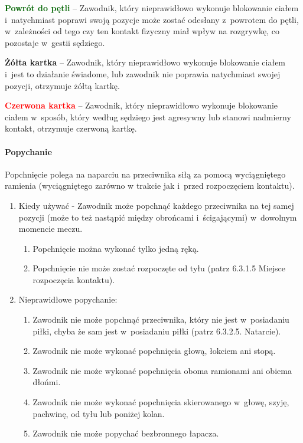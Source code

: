 \documentclass[12pt,a4paper]{article}
\newcommand\redcard[1]{\bgroup\textcolor{red}{\textbf{#1}}}
\newcommand\yellowcard[1]{\bgroup\textcolor{darkyellow}{\textbf{#1}}}
\newcommand\other[1]{\bgroup\textcolor{darkgreen}{\textbf{#1}}}
\begin{document}
\other{Powrót do pętli} -- Zawodnik, który nieprawidłowo wykonuje
blokowanie ciałem i~natychmiast poprawi swoją pozycje może zostać
odesłany z~powrotem do pętli, w~zależności od tego czy ten kontakt
fizyczny miał wpływ na rozgrywkę, co pozostaje w~gestii sędziego.

\yellowcard{Żółta kartka} -- Zawodnik, który nieprawidłowo wykonuje blokowanie
ciałem i~jest to działanie świadome, lub zawodnik nie poprawia
natychmiast swojej pozycji, otrzymuje żółtą kartkę.

\redcard{Czerwona kartka} -- Zawodnik, który nieprawidłowo wykonuje
blokowanie ciałem w~sposób, który według sędziego jest agresywny lub
stanowi nadmierny kontakt, otrzymuje czerwoną kartkę.

\paragraph{Popychanie}
Popchnięcie polega na naparciu na
przeciwnika siłą za pomocą wyciągniętego ramienia (wyciągniętego zarówno
w trakcie jak i~przed rozpoczęciem kontaktu).

\begin{enumerate}
	\item
	      Kiedy używać - Zawodnik może popchnąć każdego przeciwnika na tej samej
	      pozycji (może to też nastąpić między obrońcami i~ścigającymi) w~dowolnym momencie meczu.

	      \begin{enumerate}
		      \item
		            Popchnięcie można wykonać tylko jedną ręką.
		      \item
		            Popchnięcie nie może zostać rozpoczęte od tyłu (patrz 6.3.1.5
		            Miejsce rozpoczęcia kontaktu).
	      \end{enumerate}
	\item
	      Nieprawidłowe popychanie:

	      \begin{enumerate}
		      \item
		            Zawodnik nie może popchnąć przeciwnika, który nie jest w~posiadaniu
		            piłki, chyba że sam jest w~posiadaniu piłki (patrz 6.3.2.5.
		            Natarcie).
		      \item
		            Zawodnik nie może wykonać popchnięcia głową, łokciem ani stopą.
		      \item
		            Zawodnik nie może wykonać popchnięcia oboma ramionami ani obiema
		            dłońmi.
		      \item
		            Zawodnik nie może wykonać popchnięcia skierowanego w~głowę, szyję,
		            pachwinę, od tyłu lub poniżej kolan.
		      \item
		            Zawodnik nie może popychać bezbronnego łapacza.
	      \end{enumerate}
\end{enumerate}
\end{document}
